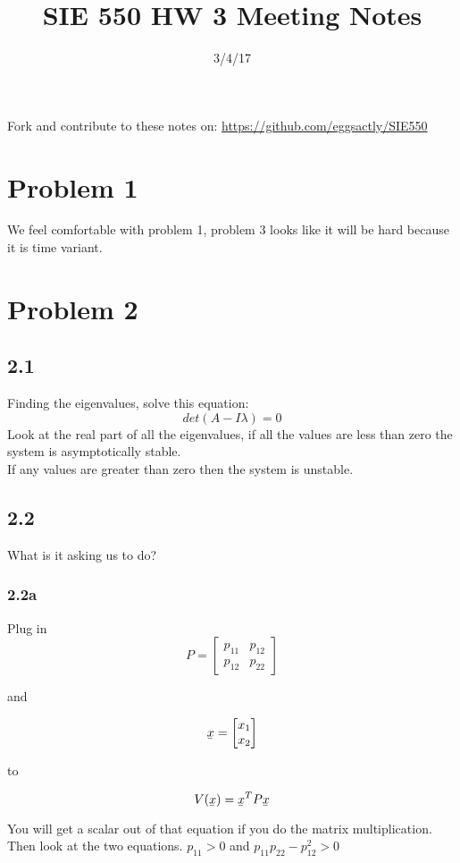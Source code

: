 \documentclass[12pt]{article}
\newcommand{\ubar}[1]{\underaccent{\bar}{#1}}
\begin{document}
\title{SIE 550 HW 3 Meeting Notes}
\date{3/4/17}

\maketitle

Fork and contribute to these notes on: \url{https://github.com/eggsactly/SIE550}

\section*{Problem 1} 
We feel comfortable with problem 1, problem 3 looks like it will be hard because it is time variant. 

\section*{Problem 2} 
\subsection*{2.1}
Finding the eigenvalues, solve this equation:
$$det(A-I\lambda)=0$$
Look at the real part of all the eigenvalues, if all the values are less than zero the system is asymptotically stable.\\
If any values are greater than zero then the system is unstable. 

\subsection*{2.2}
What is it asking us to do?

\subsubsection*{2.2a}
Plug in 
$$P=\begin{bmatrix} p_{11} & p_{12} \\
p_{12} & p_{22}
\end{bmatrix}$$ 

and 

$$\ubar{x}=\begin{bmatrix} x_{1} \\
x_{2}
\end{bmatrix}$$ 

to

$$V(\ubar{x})=\ubar{x}^TP\ubar{x}$$

You will get a scalar out of that equation if you do the matrix multiplication. Then look at the two equations. 
$p_{11}>0$ 
and
$p_{11}p_{22}-p_{12}^2>0$ \\
\end{document}
